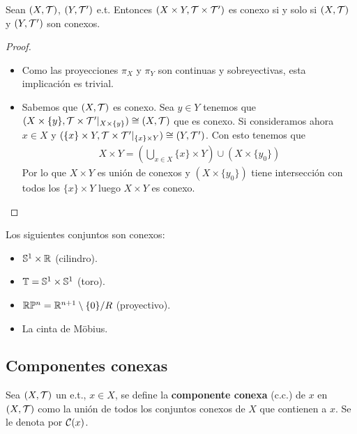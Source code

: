 \begin{prop}
    Sean $(X, \mathcal{T})$, $(Y, \mathcal{T}')$ e.t. Entonces $(X\times Y, \mathcal{T}\times \mathcal{T}')$ es conexo si y solo si $(X, \mathcal{T})$ y $(Y, \mathcal{T}')$ son conexos.
    \begin{proof}\
        \begin{itemize}
            \item[$\Rightarrow$)] Como las proyecciones $\pi_X$ y $\pi_Y$ son continuas y sobreyectivas, esta implicación es trivial.
            \item[$\Leftarrow$)] Sabemos que $(X, \mathcal{T})$ es conexo. Sea $y\in Y$ tenemos que $(X\times \{y\}, \mathcal{T}\times \mathcal{T}'|_{X\times\{y\}})\cong (X, \mathcal{T})$ que es conexo. Si consideramos ahora $x\in X$ y  $(\{x\}\times Y, \mathcal{T}\times \mathcal{T}'|_{\{x\}\times Y})\cong (Y, \mathcal{T}')$. Con esto tenemos que
            \begin{align*}
                X\times Y = \left(\bigcup\limits_{x\in X}\{x\}\times Y\right) \cup \left(X \times \{y_0\}\right)
            \end{align*}
            Por lo que $X\times Y$ es unión de conexos y $(X \times \{y_0\})$ tiene intersección con todos los $\{x\}\times Y$ luego $X\times Y$ es conexo.

        \end{itemize}
    \end{proof}
\end{prop}

\begin{ejemplo}
    Los siguientes conjuntos son conexos:
    \begin{itemize}
        \item $\mathbb{S}^1 \times \mathbb{R}$ (cilindro).
        \item $\mathbb{T}=\mathbb{S}^1 \times \mathbb{S}^1$ (toro).
        \item $\mathbb{R}\mathbb{P}^n = \mathbb{R}^{n+1}\setminus \{0\}/R$ (proyectivo).
        \item La cinta de Möbius.
    \end{itemize}
    \endsquare
\end{ejemplo}

\subsection{Componentes conexas}
\begin{definicion}
    Sea $(X, \mathcal{T})$ un e.t., $x\in X$, se define la \textbf{componente conexa} (c.c.) de $x$ en $(X, \mathcal{T})$ como la unión de todos los conjuntos conexos de $X$ que contienen a $x$. Se le denota por $\mathcal{C}(x)$.
    \endsquare
\end{definicion}

